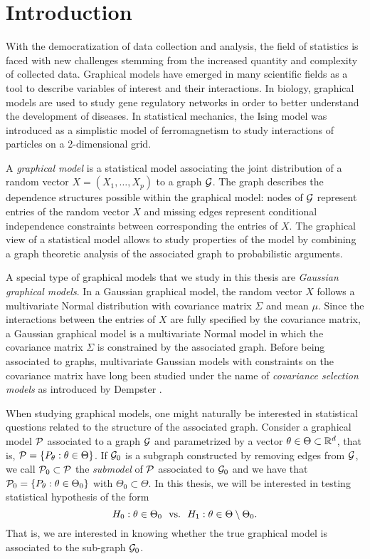 \section{Introduction}

With the democratization of data collection and analysis, the field of statistics is faced with new challenges stemming from the increased quantity and complexity of collected data. Graphical models have emerged in many scientific fields as a tool to describe variables of interest and their interactions. In biology, graphical models are used to study gene regulatory networks in order to better understand the development of diseases. In statistical mechanics, the Ising model \cite{ising1925beitrag} was introduced as a simplistic model of ferromagnetism to study interactions of particles on a 2-dimensional grid.

A \textit{graphical model} is a statistical model associating the joint distribution of a random vector $X = (X_1, \ldots, X_p)$ to a graph ${\mathcal{G}}$. The graph describes the dependence structures possible within the graphical model: nodes of ${\mathcal{G}}$ represent entries of the random vector $X$ and missing edges represent conditional independence constraints between corresponding the entries of $X$. The graphical view of a statistical model allows to study properties of the model by combining a graph theoretic analysis of the associated graph to probabilistic arguments.

A special type of graphical models that we study in this thesis are \textit{Gaussian graphical models}. In a Gaussian graphical model, the random vector $X$ follows a multivariate Normal distribution with covariance matrix $\Sigma$ and mean $\mu$. Since the interactions between the entries of $X$ are fully specified by the covariance matrix, a Gaussian graphical model is a multivariate Normal model in which the covariance matrix $\Sigma$ is constrained by the associated graph. Before being associated to graphs, multivariate Gaussian models with constraints on the covariance matrix have long been studied under the name of \textit{covariance selection models} as introduced by Dempster \cite{10.2307/2528966}.

When studying graphical models, one might naturally be interested in statistical questions related to the structure of the associated graph. Consider a graphical model ${\mathcal{P}}$ associated to a graph ${\mathcal{G}}$ and parametrized by a vector $\theta \in \Theta \subset \mathbb{R}^d$, that is, ${\mathcal{P}} = {\left\{ P_\theta : \theta \in \Theta \right\}}$. If ${\mathcal{G}}_0$ is a subgraph constructed by removing edges from ${\mathcal{G}}$, we call ${\mathcal{P}}_0 \subset {\mathcal{P}}$ the \textit{submodel} of ${\mathcal{P}}$ associated to ${\mathcal{G}}_0$ and we have that ${\mathcal{P}}_0 = {\left\{ P_\theta : \theta \in \Theta_0 \right\}}$ with $\Theta_0 \subset \Theta$. In this thesis, we will be interested in testing statistical hypothesis of the form
\begin{equation*}
    H_0 : \theta \in \Theta_0 \ \ \t{vs.} \ \ H_1 : \theta \in \Theta \setminus \Theta_0.
\end{equation*}
That is, we are interested in knowing whether the true graphical model is associated to the sub-graph ${\mathcal{G}}_0$.

